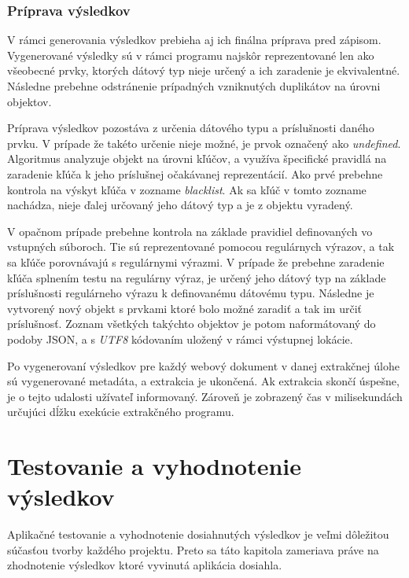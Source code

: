 \newpage

\subsection{Príprava výsledkov}

V rámci generovania výsledkov prebieha aj ich finálna príprava pred zápisom. Vygenerované výsledky sú v rámci programu najskôr reprezentované len ako všeobecné prvky, ktorých dátový typ nieje určený a ich zaradenie je ekvivalentné. Následne prebehne odstránenie prípadných vzniknutých duplikátov na úrovni objektov. 

Príprava výsledkov pozostáva z určenia dátového typu a príslušnosti daného prvku. V prípade že takéto určenie nieje možné, je prvok označený ako \textit{undefined}. Algoritmus analyzuje objekt na úrovni kľúčov, a využíva špecifické pravidlá na zaradenie kľúča k jeho príslušnej očakávanej reprezentácií. Ako prvé prebehne kontrola na výskyt kľúča v zozname \textit{blacklist}. Ak sa kľúč v tomto zozname nachádza, nieje ďalej určovaný jeho dátový typ a je z objektu vyradený. 

V opačnom prípade prebehne kontrola na základe pravidiel definovaných vo vstupných súboroch. Tie sú reprezentované pomocou regulárnych výrazov, a tak sa kľúče porovnávajú s regulárnymi výrazmi. V prípade že prebehne zaradenie kľúča splnením testu na regulárny výraz, je určený jeho dátový typ na základe príslušnosti regulárneho výrazu k definovanému dátovému typu. Následne je vytvorený nový objekt s prvkami ktoré bolo možné zaradiť a tak im určiť príslušnosť. Zoznam všetkých takýchto objektov je potom naformátovaný do podoby JSON, a s \textit{UTF8} kódovaním uložený v rámci výstupnej lokácie. 

\bigskip

Po vygenerovaní výsledkov pre každý webový dokument v danej extrakčnej úlohe sú vygenerované metadáta, a extrakcia je ukončená. Ak extrakcia skončí úspešne, je o tejto udalosti užívateľ informovaný. Zároveň je zobrazený čas v milisekundách určujúci dĺžku exekúcie extrakčného programu.

\chapter{Testovanie a vyhodnotenie výsledkov}

Aplikačné testovanie a vyhodnotenie dosiahnutých výsledkov je veľmi dôležitou súčasťou tvorby každého projektu. Preto sa táto kapitola zameriava práve na zhodnotenie výsledkov ktoré vyvinutá aplikácia dosiahla. 

